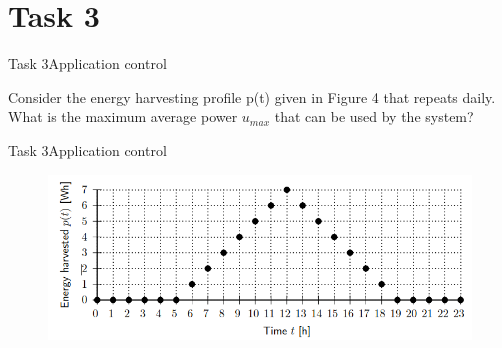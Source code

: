 
\section{Task 3}

\setcounter{task}{1}

\begin{frame}{Task 3}{Application control}
    \begin{tasknoinc}
        Consider the energy harvesting proﬁle p(t) given in Figure 4 that repeats daily. What is the maximum average power $u_{max}$ that can be used by the system?
    \end{tasknoinc}
\end{frame}

\begin{frame}{Task 3}{Application control}
    \begin{solutionnoinc}
        \begin{figure}
            \centering
            \includegraphics[scale=0.5]{figures/harvestingProfile.PNG}
        \end{figure}
    \end{solutionnoinc}
\end{frame}

